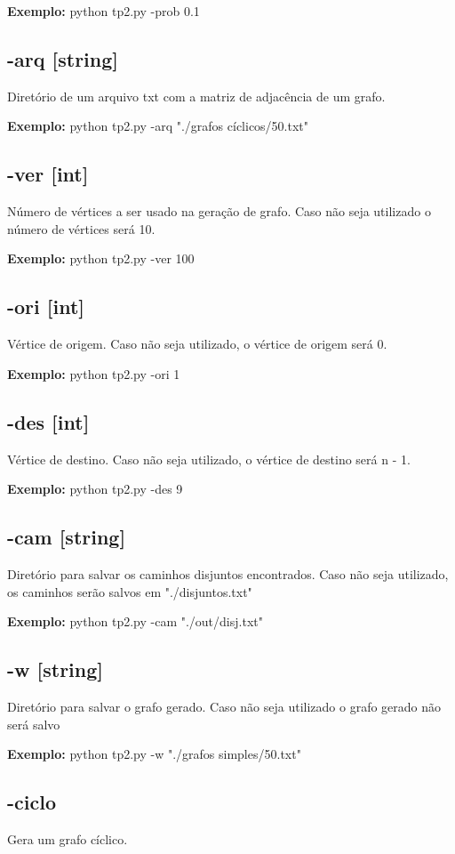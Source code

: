 \textbf{Exemplo:} python tp2.py -prob 0.1

\subsection {\esp -arq [string]} 
Diretório de um arquivo txt com a matriz de adjacência de um grafo.

\textbf{Exemplo:} python tp2.py -arq "./grafos cíclicos/50.txt"

\subsection {\esp -ver [int]} 
Número de vértices a ser usado na geração de grafo. Caso não seja utilizado o número de vértices será 10.

\textbf{Exemplo:} python tp2.py -ver 100

\subsection {\esp -ori [int]}
Vértice de origem. Caso não seja utilizado, o vértice de origem será 0.

\textbf{Exemplo:} python tp2.py -ori 1

\subsection {\esp -des [int]}
Vértice de destino. Caso não seja utilizado, o vértice de destino será n - 1.

\textbf{Exemplo:} python tp2.py -des 9

\subsection {\esp -cam [string]} 
Diretório para salvar os caminhos disjuntos encontrados. Caso não seja utilizado, os caminhos serão salvos em "./disjuntos.txt"

\textbf{Exemplo:} python tp2.py -cam "./out/disj.txt"

\subsection {\esp -w [string]}
 Diretório para salvar o grafo gerado. Caso não seja utilizado o grafo gerado não será salvo
 
\textbf{Exemplo:} python tp2.py -w "./grafos simples/50.txt"

\subsection {\esp -ciclo}
Gera um grafo cíclico.

